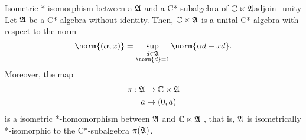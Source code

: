 \begin{theorem}{Isometric *-isomorphism between a \(\mathfrak{A}\) and a C*-subalgebra of \(\mathbb{C}\ltimes \mathfrak{A}\)}{adjoin_unity}
    Let \(\mathfrak{A}\) be a C*-algebra without identity. Then, \(\mathbb{C} \ltimes \mathfrak{A}\) is a unital C*-algebra with respect to the norm
    \begin{equation*}
        \norm{(\alpha, x)} = \sup_{\substack{d \in \algebra{A}\\\norm{d}=1}}{\norm{\alpha d + xd}}.
    \end{equation*}
    Moreover, the map
    \begin{align*}
        \pi : \mathfrak{A} &\to \mathbb{C} \ltimes \mathfrak{A}\\
                        a &\mapsto (0, a)
    \end{align*}
    is a isometric *-homomorphism between \(\mathfrak{A}\) and \(\mathbb{C} \ltimes \mathfrak{A}\) , that is, \(\mathfrak{A}\) is isometrically *-isomorphic to the C*-subalgebra \(\pi(\mathfrak{A})\).
\end{theorem}

